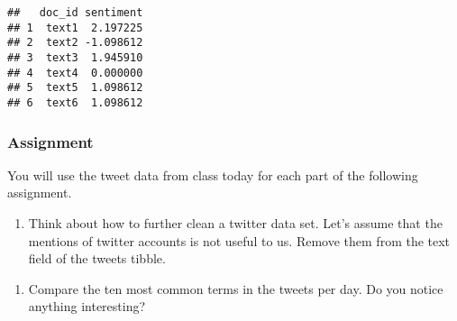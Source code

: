\documentclass[
]{article}
\newenvironment{Shaded}{\begin{snugshade}}{\end{snugshade}}
\newcommand{\FunctionTok}[1]{\textcolor[rgb]{0.00,0.00,0.00}{#1}}
\newcommand{\NormalTok}[1]{#1}
\newcommand{\OtherTok}[1]{\textcolor[rgb]{0.56,0.35,0.01}{#1}}
\newcommand{\SpecialCharTok}[1]{\textcolor[rgb]{0.00,0.00,0.00}{#1}}
\newcommand{\StringTok}[1]{\textcolor[rgb]{0.31,0.60,0.02}{#1}}
\providecommand{\tightlist}{%
  \setlength{\itemsep}{0pt}\setlength{\parskip}{0pt}}
\begin{document}
\begin{verbatim}
##   doc_id sentiment
## 1  text1  2.197225
## 2  text2 -1.098612
## 3  text3  1.945910
## 4  text4  0.000000
## 5  text5  1.098612
## 6  text6  1.098612
\end{verbatim}

\hypertarget{assignment}{%
\subsubsection{Assignment}\label{assignment}}

You will use the tweet data from class today for each part of the
following assignment.

\begin{enumerate}
\def\labelenumi{\arabic{enumi}.}
\tightlist
\item
  Think about how to further clean a twitter data set. Let's assume that
  the mentions of twitter accounts is not useful to us. Remove them from
  the text field of the tweets tibble.
\end{enumerate}

\begin{Shaded}
\end{Shaded}

\begin{enumerate}
\def\labelenumi{\arabic{enumi}.}
\setcounter{enumi}{1}
\tightlist
\item
  Compare the ten most common terms in the tweets per day. Do you notice
  anything interesting?
\end{enumerate}
\end{document}
